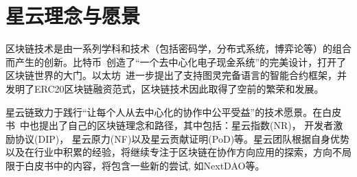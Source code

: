 \section{星云理念与愿景}
区块链技术是由一系列学科和技术（包括密码学，分布式系统，博弈论等）的组合而产生的创新。比特币~\cite{Nakamoto2008}创造了“⼀个去中⼼化电⼦现⾦系统”的完美设计，打开了区块链世界的大门。以太坊~\cite{buterin2013ethereum}进一步提出了支持图灵完备语言的智能合约框架，并发明了ERC20区块链融资范式，区块链技术因此取得了空前的繁荣和发展。

星云链致力于践行“让每个人从去中心化的协作中公平受益”的技术愿景。在白皮书~\cite{TechWhitepaper}中也提出了自己的区块链理念和路径，其中包括：星云指数(NR)， 开发者激励协议(DIP)， 星云原力(NF)以及星云贡献证明(PoD)等。星云团队根据自身优势以及在行业中积累的经验，将继续专注于区块链在协作方向应用的探索，方向不局限于白皮书中的内容，将包含一些新的尝试, 如NextDAO等。
